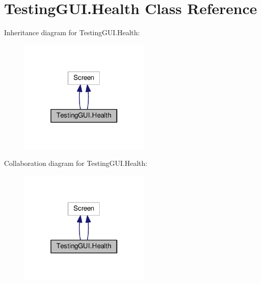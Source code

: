 \hypertarget{classTestingGUI_1_1Health}{}\section{Testing\+G\+U\+I.\+Health Class Reference}
\label{classTestingGUI_1_1Health}


Inheritance diagram for Testing\+G\+U\+I.\+Health\+:\nopagebreak
\begin{figure}[H]
\begin{center}
\leavevmode
\includegraphics[width=178pt]{classTestingGUI_1_1Health__inherit__graph}
\end{center}
\end{figure}


Collaboration diagram for Testing\+G\+U\+I.\+Health\+:\nopagebreak
\begin{figure}[H]
\begin{center}
\leavevmode
\includegraphics[width=178pt]{classTestingGUI_1_1Health__coll__graph}
\end{center}
\end{figure}
